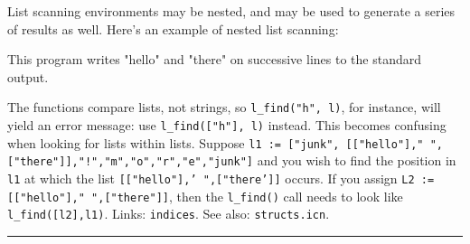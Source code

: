 
List scanning environments may be nested, and may be used to generate a
series of results as well. Here's an example of nested
list scanning:


\noindent This program writes "hello" and
"there" on successive lines to the standard
output.

The functions compare lists, not strings, so
\texttt{l\_find("h", l)}, for instance,
will yield an error message: use
\texttt{l\_find(["h"], l)} instead. This
becomes confusing when looking for lists within lists. Suppose
\texttt{l1 := ["junk",
[["hello"]," ",["there"]],"!","m","o","r","e","junk"]}
and you wish to find the position in \texttt{l1} at which the list
\texttt{[["hello"],'
",["there']]} occurs. If you
assign \texttt{L2 :=
[["hello"]," ",["there"]]}, then the
\texttt{l\_find()} call needs to look like \texttt{l\_find([l2],l1)}.
Links: \texttt{indices}. See also: \texttt{structs.icn}.

\vspace{0.25cm}\hrule{}

